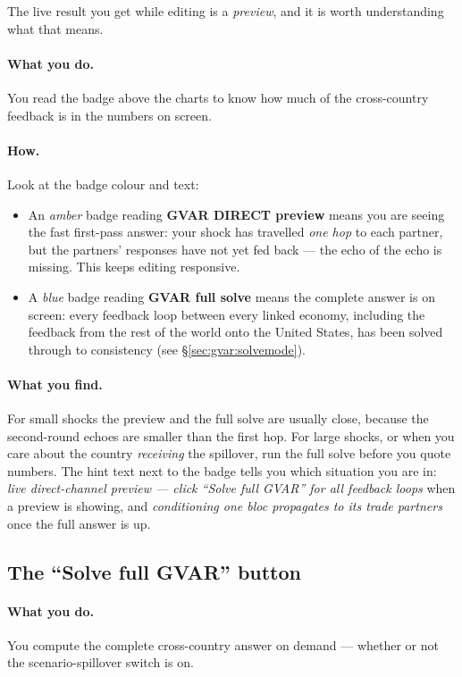 \documentclass[11pt]{article}
\theoremstyle{definition}
\theoremstyle{remark}
\begin{document}
The live result you get while editing is a \emph{preview}, and it is worth
understanding what that means.

\paragraph{What you do.} You read the badge above the charts to know how much of
the cross-country feedback is in the numbers on screen.

\paragraph{How.} Look at the badge colour and text:
\begin{itemize}
  \item An \emph{amber} badge reading \textbf{GVAR DIRECT preview} means you are
    seeing the fast first-pass answer: your shock has travelled \emph{one hop}
    to each partner, but the partners' responses have not yet fed back --- the
    echo of the echo is missing. This keeps editing responsive.
  \item A \emph{blue} badge reading \textbf{GVAR full solve} means the complete
    answer is on screen: every feedback loop between every linked economy,
    including the feedback from the rest of the world onto the United States,
    has been solved through to consistency (see \S\ref{sec:gvar:solvemode}).
\end{itemize}

\paragraph{What you find.} For small shocks the preview and the full solve are
usually close, because the second-round echoes are smaller than the first hop.
For large shocks, or when you care about the country \emph{receiving} the
spillover, run the full solve before you quote numbers. The hint text next to
the badge tells you which situation you are in: \emph{live direct-channel
preview --- click ``Solve full GVAR'' for all feedback loops} when a preview is
showing, and \emph{conditioning one bloc propagates to its trade partners} once
the full answer is up.

\subsection{The ``Solve full GVAR'' button}

\paragraph{What you do.} You compute the complete cross-country answer on
demand --- whether or not the scenario-spillover switch is on.
\end{document}
